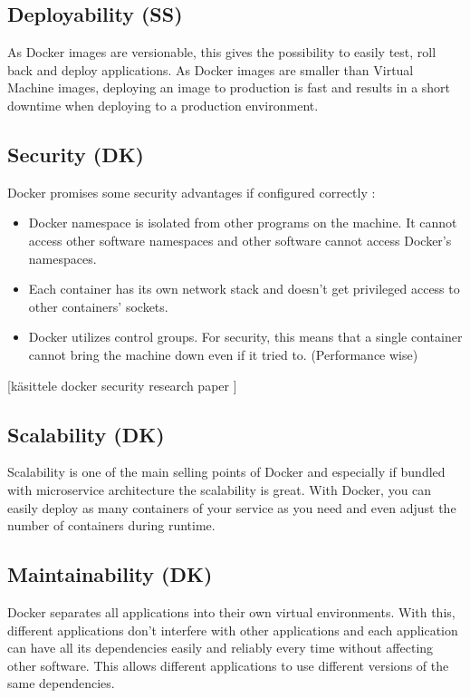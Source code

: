 \documentclass[fleqn,12pt]{olplainarticle}
\begin{document}
\subsection{Deployability (SS)}
As Docker images are versionable, this gives the possibility to easily test, roll back and deploy applications\citep{hentsu:benefits}. As Docker images are smaller than Virtual Machine images, deploying an image to production is fast and results in a short downtime when deploying to a production environment. 

\subsection{Security (DK)}
Docker promises some security advantages if configured correctly \citep{docker:security}:
\begin{itemize}
    \item  Docker namespace is isolated from other programs on the machine. It cannot access other software namespaces and other software cannot access Docker's namespaces. 
    \item Each container has its own network stack and doesn't get privileged access to other containers' sockets.
    \item Docker utilizes control groups. For security, this means that a single container cannot bring the machine down even if it tried to. (Performance wise)
    
\end{itemize}
[käsittele docker security research paper \citep{docker_security_paper}]

\subsection{Scalability (DK)}
Scalability is one of the main selling points of Docker and especially if bundled with microservice architecture the scalability is great. With Docker, you can easily deploy as many containers of your service as you need and even adjust the number of containers during runtime.

\subsection{Maintainability (DK)}
Docker separates all applications into their own virtual environments. With this, different applications don't interfere with other applications and each application can have all its dependencies easily and reliably every time without affecting other software. This allows different applications to use different versions of the same dependencies.
\end{document}
